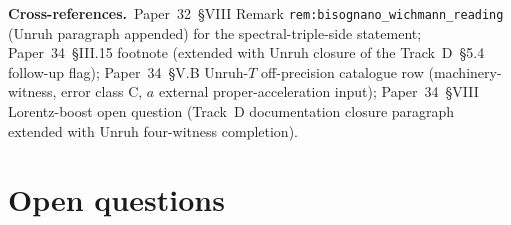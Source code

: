 \documentclass[11pt]{article}
\begin{document}
\textbf{Cross-references.}\ Paper~32~§VIII Remark
\texttt{rem:bisognano\_wichmann\_reading} (Unruh paragraph appended)
for the spectral-triple-side statement;
Paper~34~§III.15 footnote (extended with Unruh closure of the
Track~D~§5.4 follow-up flag); Paper~34~§V.B Unruh-$T$ off-precision
catalogue row (machinery-witness, error class C, $a$ external
proper-acceleration input);
Paper~34~§VIII Lorentz-boost open question (Track~D documentation
closure paragraph extended with Unruh four-witness completion).

\section{Open questions}
\label{sec:open}
\end{document}

